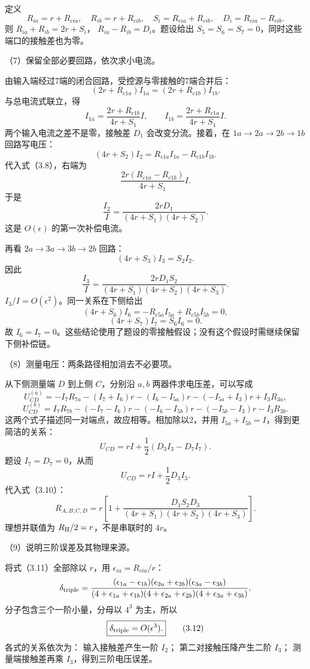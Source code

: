 \documentclass[12pt,a4paper,fontset=fandol]{ctexart}
\begin{document}
定义 \[
R_{ia}=r+R_{cia},\quad R_{ib}=r+R_{cib},\quad
S_i=R_{cia}+R_{cib},\quad D_i=R_{cia}-R_{cib}.
\] 则 \(R_{ia}+R_{ib}=2r+S_i\)， \(R_{ia}-R_{ib}=D_i\)。题设给出
\(S_5=S_6=S_7=0\)，同时这些端口的接触差也为零。

（7）保留全部必要回路，依次求小电流。

由输入端经过7端的闭合回路，受控源与零接触的7端合并后： \[
(2r+R_{c1a})I_{1a}
=(2r+R_{c1b})I_{1b}.
\] 与总电流式联立，得 \[
\boxed{
I_{1a}=\frac{2r+R_{c1b}}{4r+S_1}I,\qquad
I_{1b}=\frac{2r+R_{c1a}}{4r+S_1}I.}\tag{3.8}
\] 两个输入电流之差不是零，接触差 \(D_1\) 会改变分流。接着，在
\(1a\to2a\to2b\to1b\) 回路写电压： \[
(4r+S_2)I_2=R_{c1a}I_{1a}-R_{c1b}I_{1b}.
\] 代入式（3.8），右端为 \[
\frac{2r(R_{c1a}-R_{c1b})}{4r+S_1}I.
\] 于是 \[
\boxed{\frac{I_2}{I}
=\frac{2rD_1}{(4r+S_1)(4r+S_2)}.}\tag{3.9}
\] 这是 \(O(\epsilon)\) 的第一次补偿电流。

再看 \(2a\to3a\to3b\to2b\) 回路： \[
(4r+S_3)I_3=S_2I_2.
\] 因此 \[
\boxed{\frac{I_3}{I}
=\frac{2rD_1S_2}
{(4r+S_1)(4r+S_2)(4r+S_3)}.}\tag{3.10}
\] \(I_3/I=O(\epsilon^2)\)。同一关系在下侧给出 \[
(4r+S_6)I_6=-R_{c5a}I_{5a}+R_{c5b}I_{5b}=0,
\] \[
(4r+S_7)I_7=S_6I_6=0.
\] 故
\(I_6=I_7=0\)。这些结论使用了题设的零接触假设；没有这个假设时需继续保留下侧补偿链。

（8）测量电压：两条路径相加消去不必要项。

从下侧测量端 \(D\) 到上侧 \(C\)，分别沿 \(a,b\) 两器件求电压差，可以写成
\[
U_{CD}^{(a)}
=-I_7R_{7a}-(I_7+I_6)r
-(I_6-I_{5a})r-(-I_{5a}+I_3)r+I_3R_{3a},
\] \[
U_{CD}^{(b)}
=I_7R_{7b}-(-I_7-I_6)r
-(-I_6-I_{5b})r-(-I_{5b}-I_3)r-I_3R_{3b}.
\] 这两个式子描述同一对端点，故应相等。相加除以2，并用
\(I_{5a}+I_{5b}=I\)，得到更简洁的关系： \[
U_{CD}=rI+\frac12(D_3I_3-D_7I_7).
\] 题设 \(I_7=D_7=0\)，从而 \[
U_{CD}=rI+\frac12D_3I_3.
\] 代入式（3.10）： \[
\boxed{
R_{A,B;C,D}
=r\left[
1+\frac{D_1S_2D_3}
{(4r+S_1)(4r+S_2)(4r+S_3)}
\right].}\tag{3.11}
\] 理想并联值为 \(R_{\rm H}/2=r\)，不是串联时的 \(4r\)。

（9）说明三阶误差及其物理来源。

将式（3.11）全部除以 \(r\)，用 \(\epsilon_{ia}=R_{cia}/r\)： \[
\delta_{\rm triple}=
\frac{(\epsilon_{1a}-\epsilon_{1b})
(\epsilon_{2a}+\epsilon_{2b})
(\epsilon_{3a}-\epsilon_{3b})}
{(4+\epsilon_{1a}+\epsilon_{1b})
(4+\epsilon_{2a}+\epsilon_{2b})
(4+\epsilon_{3a}+\epsilon_{3b})}.
\] 分子包含三个一阶小量，分母以 \(4^3\) 为主，所以 \[
\boxed{\delta_{\rm triple}=O(\epsilon^3).}\tag{3.12}
\] 各式的关系依次为： 输入接触差产生一阶 \(I_2\)；
第二对接触压降产生二阶 \(I_3\)； 测量端接触差再乘
\(I_3\)，得到三阶电压误差。
\end{document}
